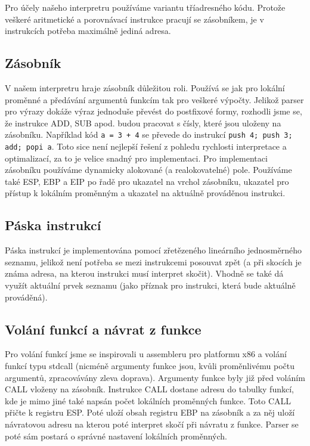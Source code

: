 \documentclass[a4paper,11pt,titlepage]{article}
\begin{document}
Pro účely našeho interpretru používáme variantu tříadresného kódu. Pro\-to\-že veškeré aritmetické a porovnávací instrukce pracují se zásobníkem, je v instrukcích potřeba maximálně jediná adresa.

\subsection{Zásobník}

V našem interpretru hraje zásobník důležitou roli. Používá se jak pro lokální proměnné a předávání argumentů funkcím tak pro veškeré výpočty. Jelikož parser pro výrazy dokáže výraz jednoduše převést do postfixové formy, rozhodli jsme se, že instrukce ADD, SUB apod. budou pracovat s čísly, které jsou uloženy na zásobníku. Například kód {\tt a = 3 + 4} se převede do instrukcí {\tt push 4; push 3; add; popi a}. Toto sice není nejlepší řešení z pohledu rychlosti interpretace a optimalizací, za to je velice snadný pro implementaci. Pro implementaci zásobníku používáme dynamicky alokované (a realokovatelné) pole. Používáme také  ESP, EBP a EIP po řadě pro ukazatel na vrchol zásobníku, ukazatel pro přístup k lokálním proměnným a ukazatel na aktuálně prováděnou instrukci.

\subsection{Páska instrukcí}

Páska instrukcí je implementována pomocí zřetězeného lineárního jedno\-směr\-né\-ho seznamu, jelikož není potřeba se mezi instrukcemi posouvat zpět (a při skocích je známa adresa, na kterou instrukci musí interpret skočit). Vhodně se také dá využít aktuální prvek seznamu (jako příznak pro instrukci, která bude aktuálně prováděná).

\subsection{Volání funkcí a návrat z funkce}

Pro volání funkcí jsme se inspirovali u assembleru pro platformu x86 a volání funkcí typu stdcall (nicméně argumenty funkce jsou, kvůli proměnlivému počtu argumentů, zpracovávány zleva doprava). Argumenty funkce byly již před voláním CALL vloženy na zásobník. Instrukce CALL dostane adresu do tabulky funkcí, kde je mimo jiné také napsán počet lokálních pro\-měn\-ných funkce. Toto CALL přičte k registru ESP. Poté uloží obsah registru EBP na zásobník a za něj uloží návratovou adresu na kterou poté interpret skočí při návratu z funkce. Parser se poté sám postará o správné nastavení lokálních proměnných.
\end{document}
